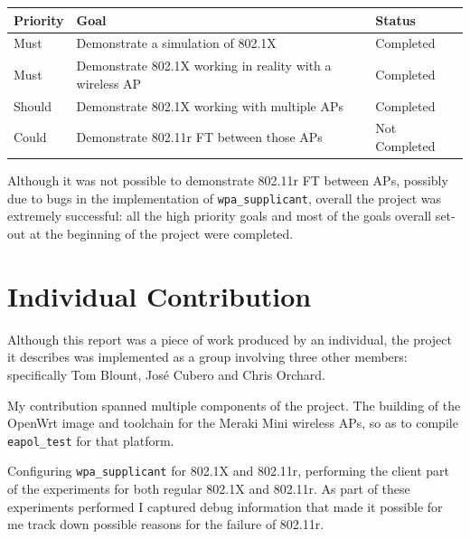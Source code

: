 \documentclass[pdftex, 12pt, a4paper]{article}
\begin{document}
\begin{table}[!hb]
    \label{tab:evaluation}
    \begin{tabular}{|l|l|l|}
        \hline
        Priority & Goal                                                     & Status        \\ \hline
        Must     & Demonstrate a simulation of 802.1X                       & Completed     \\ 
        Must     & Demonstrate 802.1X working in reality with a wireless AP & Completed     \\ 
        Should   & Demonstrate 802.1X working with multiple APs             & Completed     \\ 
        Could    & Demonstrate 802.11r FT between those APs                 & Not Completed \\
        \hline
    \end{tabular}
\end{table}

Although it was not possible to demonstrate 802.11r FT between APs, possibly due to bugs in the implementation of \verb`wpa_supplicant`, overall the project was extremely successful: all the high priority goals and most of the goals overall set-out at the beginning of the project were completed.

\section{Individual Contribution}
Although this report was a piece of work produced by an individual, the project it describes was implemented as a group involving three other members: specifically Tom Blount, José Cubero and Chris Orchard.

My contribution spanned multiple components of the project.  The building of the OpenWrt image and toolchain for the Meraki Mini wireless APs, so as to compile \verb`eapol_test` for that platform.

Configuring \verb`wpa_supplicant` for 802.1X and 802.11r, performing the client part of the experiments for both regular 802.1X and 802.11r.  As part of these experiments performed I captured debug information that made it possible for me track down possible reasons for the failure of 802.11r.


{}

\appendix

\end{document}
